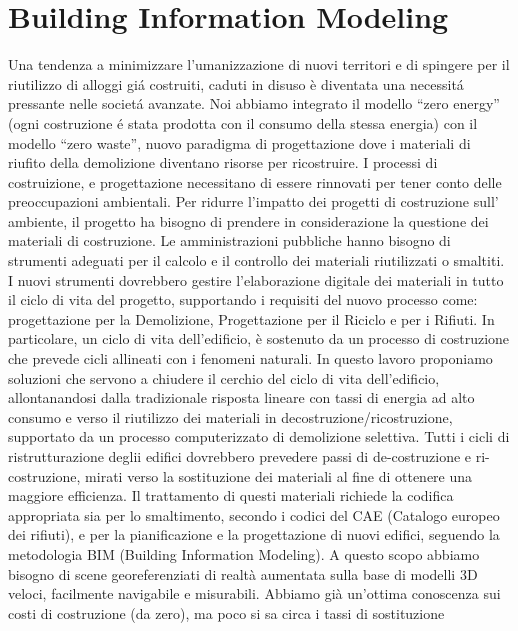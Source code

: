 \section{Building Information Modeling}
\label{sec:chapter_1_section_1}
\noindent

Una tendenza a minimizzare l'umanizzazione di nuovi territori e di spingere per il riutilizzo di alloggi
gi\'a costruiti, caduti in disuso \`e diventata una necessit\'a pressante nelle societ\'a avanzate.
Noi abbiamo integrato il modello ``zero energy'' (ogni costruzione \'e stata prodotta con il consumo della stessa energia)
con il modello ``zero waste'', nuovo paradigma di progettazione dove i materiali di riufito della demolizione
diventano risorse per ricostruire\cite{altamura:12}.
I processi di costruizione, e progettazione necessitano di essere rinnovati per tener conto delle preoccupazioni
ambientali. Per ridurre l'impatto dei progetti di costruzione sull' ambiente, il progetto ha bisogno di prendere in
considerazione la questione dei materiali di costruzione.
Le amministrazioni pubbliche hanno bisogno di strumenti adeguati per il calcolo e il controllo dei materiali
riutilizzati o smaltiti.
I nuovi strumenti dovrebbero gestire l'elaborazione digitale dei materiali in tutto il ciclo di vita del progetto,
supportando i requisiti del nuovo processo come: progettazione per la Demolizione, Progettazione per il Riciclo e per i Rifiuti.
In particolare, un ciclo di vita dell'edificio, è sostenuto da un processo di costruzione che prevede cicli allineati
con i fenomeni naturali.
In questo lavoro proponiamo soluzioni che servono a chiudere il cerchio del ciclo di vita dell'edificio, allontanandosi
dalla tradizionale risposta lineare con tassi di energia ad alto consumo e verso il riutilizzo
dei materiali in decostruzione/ricostruzione, supportato da un processo computerizzato di demolizione selettiva.
Tutti i cicli di ristrutturazione deglii edifici dovrebbero prevedere passi di de-costruzione e ri-costruzione, mirati
verso la sostituzione dei materiali al fine di ottenere una maggiore efficienza. Il trattamento di questi materiali
richiede la codifica appropriata sia per lo smaltimento, secondo i codici del CAE (Catalogo europeo dei rifiuti),
e per la pianificazione e la progettazione di nuovi edifici, seguendo la metodologia BIM (Building Information Modeling).
A questo scopo abbiamo bisogno di scene georeferenziati di realtà aumentata sulla base di modelli 3D veloci,
facilmente navigabile e misurabili.
Abbiamo già un'ottima conoscenza sui costi di costruzione (da zero), ma poco si sa circa i tassi di sostituzione
